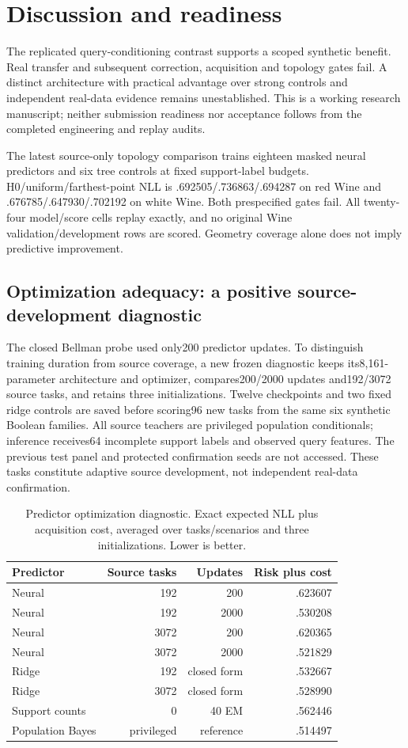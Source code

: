 \documentclass[10pt]{article}
\begin{document}
\section{Discussion and readiness}
The replicated query-conditioning contrast supports a scoped synthetic benefit. Real transfer and subsequent correction, acquisition and topology gates fail. A distinct architecture with practical advantage over strong controls and independent real-data evidence remains unestablished. This is a working research manuscript; neither submission readiness nor acceptance follows from the completed engineering and replay audits.

The latest source-only topology comparison trains eighteen masked neural predictors and six tree controls at fixed support-label budgets. H0/uniform/farthest-point NLL is .692505/.736863/.694287 on red Wine and .676785/.647930/.702192 on white Wine. Both prespecified gates fail. All twenty-four model/score cells replay exactly, and no original Wine validation/development rows are scored. Geometry coverage alone does not imply predictive improvement.

\subsection{Optimization adequacy: a positive source-development diagnostic}
The closed Bellman probe used only200 predictor updates. To distinguish training duration from source coverage, a new frozen diagnostic keeps its8,161-parameter architecture and optimizer, compares200/2000 updates and192/3072 source tasks, and retains three initializations. Twelve checkpoints and two fixed ridge controls are saved before scoring96 new tasks from the same six synthetic Boolean families. All source teachers are privileged population conditionals; inference receives64 incomplete support labels and observed query features. The previous test panel and protected confirmation seeds are not accessed. These tasks constitute adaptive source development, not independent real-data confirmation.

\begin{table}[t]
\centering\small
\caption{Predictor optimization diagnostic. Exact expected NLL plus acquisition cost, averaged over tasks/scenarios and three initializations. Lower is better.}
\begin{tabular}{lrrr}
\toprule
Predictor & Source tasks & Updates & Risk plus cost\\
\midrule
Neural &192&200&.623607\\
Neural &192&2000&.530208\\
Neural &3072&200&.620365\\
Neural &3072&2000&.521829\\
Ridge &192&closed form&.532667\\
Ridge &3072&closed form&.528990\\
Support counts &0&40 EM&.562446\\
Population Bayes &privileged&reference&.514497\\
\bottomrule
\end{tabular}
\end{table}
\end{document}
